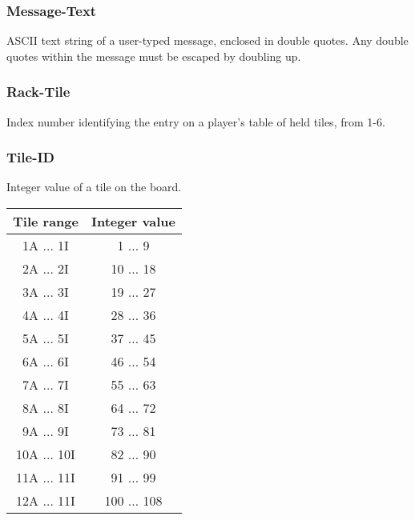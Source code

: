 \documentclass{article}
\begin{document}

\subsubsection{Message-Text} %
\label{ssub:message_text}

ASCII text string of a user-typed message, enclosed in double quotes. Any double quotes within the message must be escaped by doubling up.


\subsubsection{Rack-Tile} %
\label{ssub:rack_tile}

Index number identifying the entry on a player's table of held tiles, from 1-6.


\subsubsection{Tile-ID} %
\label{ssub:tile_id}

Integer value of a tile on the board.

\begin{tabular}{c|c}
  Tile range & Integer value              \\
  \hline
   1A $\ldots$  1I &   1 $\ldots$   9     \\
   2A $\ldots$  2I &  10 $\ldots$  18     \\
   3A $\ldots$  3I &  19 $\ldots$  27     \\
   4A $\ldots$  4I &  28 $\ldots$  36     \\
   5A $\ldots$  5I &  37 $\ldots$  45     \\
   6A $\ldots$  6I &  46 $\ldots$  54     \\
   7A $\ldots$  7I &  55 $\ldots$  63     \\
   8A $\ldots$  8I &  64 $\ldots$  72     \\
   9A $\ldots$  9I &  73 $\ldots$  81     \\
  10A $\ldots$ 10I &  82 $\ldots$  90     \\
  11A $\ldots$ 11I &  91 $\ldots$  99     \\
  12A $\ldots$ 11I & 100 $\ldots$ 108
\end{tabular}
\end{document}
